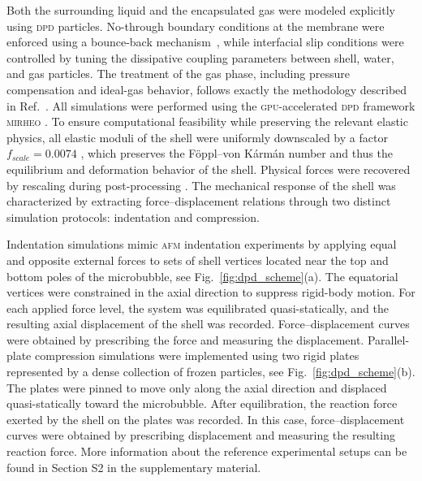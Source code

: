\documentclass[%
 aip,
 jcp,
 amsmath,amssymb,
 preprint,%
]{revtex4-1}
\begin{document}
Both the surrounding liquid and the encapsulated gas were modeled explicitly using \textsc{dpd} particles. No-through boundary conditions at the membrane were enforced using a bounce-back mechanism~\citep{revenga1999boundary,fedosov2010multiscale}, while interfacial slip conditions were controlled by tuning the dissipative coupling parameters between shell, water, and gas particles. The treatment of the gas phase, including pressure compensation and ideal-gas behavior, follows exactly the methodology described in Ref.~\cite{ntarakas2025dissipative}. All simulations were performed using the \textsc{gpu}-accelerated \textsc{dpd} framework \textsc{mirheo} \cite{alexeev2020mirheo}. To ensure computational feasibility while preserving the relevant elastic physics, all elastic moduli of the shell were uniformly downscaled by a factor $f_{scale} = 0.0074$ \cite{ntarakas2025dissipative}, which preserves the F\"oppl--von K\'arm\'an number \cite{paulose2012fluctuating} and thus the equilibrium and deformation behavior of the shell. Physical forces were recovered by rescaling during post-processing \cite{ntarakas2025dissipative}. The mechanical response of the shell was characterized by extracting force–displacement relations through two distinct simulation protocols: indentation and compression.


Indentation simulations mimic \textsc{afm} indentation experiments by applying equal and opposite external forces to sets of shell vertices located near the top and bottom poles of the microbubble, see Fig.~\ref{fig:dpd_scheme}(a). The equatorial vertices were constrained in the axial direction to suppress rigid-body motion. For each applied force level, the system was equilibrated quasi-statically, and the resulting axial displacement of the shell was recorded. Force--displacement curves were obtained by prescribing the force and measuring the displacement. Parallel-plate compression simulations were implemented using two rigid plates represented by a dense collection of frozen particles, see Fig.~\ref{fig:dpd_scheme}(b). The plates were pinned to move only along the axial direction and displaced quasi-statically toward the microbubble. After equilibration, the reaction force exerted by the shell on the plates was recorded. In this case, force--displacement curves were obtained by prescribing displacement and measuring the resulting reaction force. More information about the reference experimental setups can be found in Section S2 in the supplementary material.
\end{document}
